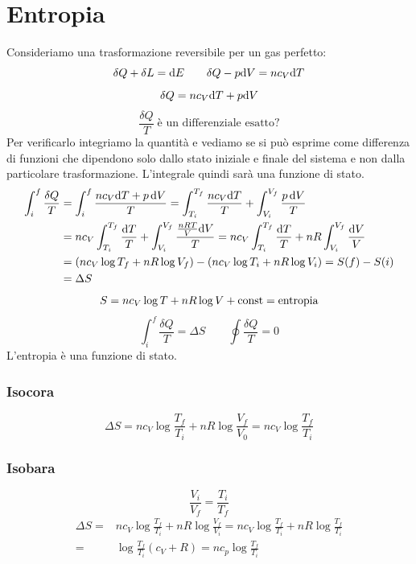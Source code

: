 \section{Entropia}
Consideriamo una trasformazione reversibile per un gas perfetto:
\begin{equation*}\delta Q+\delta L=\mathrm{d} E\qquad \delta Q-p\mathrm{d} V=nc_V\mathrm{d} T\end{equation*}
\begin{equation*}\delta Q=nc_V\mathrm{d} T+p\mathrm{d} V\end{equation*}
\begin{equation*}\frac{\delta Q}{T}\;\text{è un differenziale esatto?}\end{equation*}
Per verificarlo integriamo la quantità e vediamo se si può esprime come differenza di funzioni che dipendono solo dallo stato iniziale e finale del sistema e non dalla particolare trasformazione. L'integrale quindi sarà una funzione di stato.
\begin{align*}
\int_i^f\frac{\delta Q}{T}&=\int_i^f\frac{nc_V\mathrm{d} T+p\,\mathrm{d} V}{T}=\int_{T_i}^{T_f}\frac{nc_V\mathrm{d} T}{T}+\int_{V_i}^{V_f}\frac{p\,\mathrm{d} V}{T}\\
&=nc_V\int_{T_i}^{T_f}\frac{\mathrm{d} T}{T}+\int_{V_i}^{V_f}\frac{\frac{nRT}{V}\mathrm{d} V}{T}=nc_V\int_{T_i}^{T_f}\frac{\mathrm{d} T}{T}+nR\int_{V_i}^{V_f}\frac{\mathrm{d} V}{V}\\
&=(nc_V\log T_f+nR\log V_f)-(nc_V\log T_i+nR\log V_i)=S(f)-S(i)\\&=\Delta S
\end{align*}
\begin{equation*}S=nc_V\log T+nR\log V+\text{const}=\text{entropia}\end{equation*}
\begin{equation*}\int_i^f\frac{\delta Q}{T}=\Delta S\qquad \oint\frac{\delta Q}{T}=0\end{equation*}
L'entropia è una funzione di stato.
\subsubsection{Isocora}
\begin{equation*}\Delta S=nc_V\log\frac{T_f}{T_i}+nR\log\frac{V_f}{V_0}=nc_V\log\frac{T_f}{T_i}\end{equation*}
\subsubsection{Isobara}
\begin{equation*}\frac{V_i}{V_f}=\frac{T_i}{T_f}\end{equation*}
\begin{align*}
\Delta S=&nc_V\log\frac{T_f}{T_i}+nR\log\frac{V_f}{V_i}=nc_V\log\frac{T_f}{T_i}+nR\log\frac{T_f}{T_i}\\
=&\log\frac{T_f}{T_i}(c_V+R)=nc_p\log\frac{T_f}{T_i}
\end{align*}
